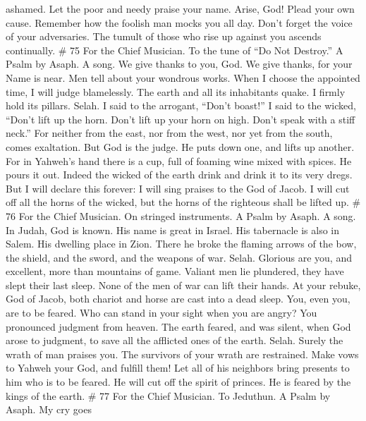 ashamed. Let the poor and needy praise your name.  Arise,
God! Plead your own cause. Remember how the foolish man mocks you all
day.  Don't forget the voice of your adversaries. The
tumult of those who rise up against you ascends continually. \# 75 For
the Chief Musician. To the tune of ``Do Not Destroy.'' A Psalm by Asaph.
A song.  We give thanks to you, God. We give thanks, for
your Name is near. Men tell about your wondrous works.  When
I choose the appointed time, I will judge blamelessly.  The
earth and all its inhabitants quake. I firmly hold its pillars. Selah.
 I said to the arrogant, ``Don't boast!'' I said to the
wicked, ``Don't lift up the horn.  Don't lift up your horn
on high. Don't speak with a stiff neck.''  For neither from
the east, nor from the west, nor yet from the south, comes exaltation.
 But God is the judge. He puts down one, and lifts up
another.  For in Yahweh's hand there is a cup, full of
foaming wine mixed with spices. He pours it out. Indeed the wicked of
the earth drink and drink it to its very dregs.  But I will
declare this forever: I will sing praises to the God of Jacob.
 I will cut off all the horns of the wicked, but the horns
of the righteous shall be lifted up. \# 76 For the Chief Musician. On
stringed instruments. A Psalm by Asaph. A song.  In Judah,
God is known. His name is great in Israel.  His tabernacle
is also in Salem. His dwelling place in Zion.  There he
broke the flaming arrows of the bow, the shield, and the sword, and the
weapons of war. Selah.  Glorious are you, and excellent,
more than mountains of game.  Valiant men lie plundered,
they have slept their last sleep. None of the men of war can lift their
hands.  At your rebuke, God of Jacob, both chariot and horse
are cast into a dead sleep.  You, even you, are to be
feared. Who can stand in your sight when you are angry?  You
pronounced judgment from heaven. The earth feared, and was silent,
 when God arose to judgment, to save all the afflicted ones
of the earth. Selah.  Surely the wrath of man praises you.
The survivors of your wrath are restrained.  Make vows to
Yahweh your God, and fulfill them! Let all of his neighbors bring
presents to him who is to be feared.  He will cut off the
spirit of princes. He is feared by the kings of the earth. \# 77 For the
Chief Musician. To Jeduthun. A Psalm by Asaph.  My cry goes
